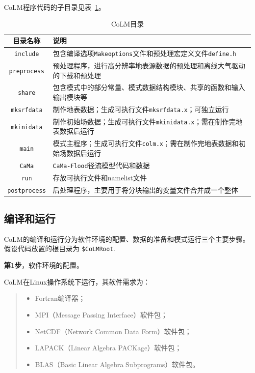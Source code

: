 \documentclass[a4paper,12pt,twoside]{article}
\begin{document}
CoLM程序代码的子目录见表~\ref{subdirectories}。
\begin{table}[!htbp]\small
\caption{CoLM目录} \label{subdirectories}
\centering \renewcommand{\arraystretch}{1.5}
\begin{tabular}{cp{}}
\toprule
\textbf{目录名称} & \textbf{说明} \\
\midrule
\texttt{include} & 包含编译选项\texttt{Makeoptions}文件和预处理宏定义文件\texttt{define.h} \\
\texttt{preprocess} & 预处理程序，进行高分辨率地表源数据的预处理和离线大气驱动的下载和预处理 \\
\texttt{share} & 包含模式中的部分常量、模式数据结构模块、共享的函数和输入输出模块等 \\
\texttt{mksrfdata} & 制作地表数据；生成可执行文件\texttt{mksrfdata.x}；可独立运行 \\
\texttt{mkinidata} & 制作初始场数据；生成可执行文件\texttt{mkinidata.x}；需在制作完地表数据后运行\\
\texttt{main} & 模式主程序；生成可执行文件\texttt{colm.x}；需在制作完地表数据和初始场数据后运行\\
\texttt{CaMa} & \texttt{CaMa-Flood}径流模型代码和数据 \\
\texttt{run} & 存放可执行文件和namelist文件 \\
\texttt{postprocess} & 后处理程序，主要用于将分块输出的变量文件合并成一个整体 \\
\bottomrule
\end{tabular}
\end{table}

\subsection{编译和运行}\label{comprun}

CoLM的编译和运行分为软件环境的配置、数据的准备和模式运行三个主要步骤。假设代码放置的根目录为 \texttt{\$CoLMRoot}.

\textbf{第1步}，软件环境的配置。

CoLM在Linux操作系统下运行，其软件需求为：
\begin{quote}
\begin{itemize}
\setlength{\itemsep}{0pt}
\setlength{\parsep}{0pt}
\setlength{\parskip}{0pt}
    \item Fortran编译器；
    \item MPI（Message Passing Interface）软件包；
    \item NetCDF（Network Common Data Form）软件包；
    \item LAPACK（Linear Algebra PACKage）软件包；
    \item BLAS（Basic Linear Algebra Subprograms）软件包。
\end{itemize}
\end{quote}
\end{document}
